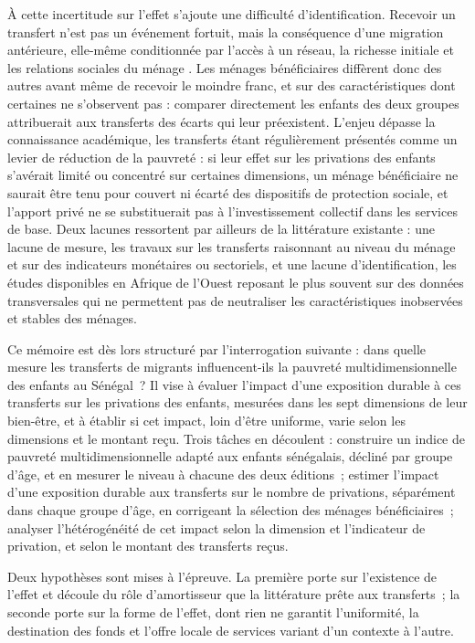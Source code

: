 À cette incertitude sur l'effet s'ajoute une difficulté d'identification.
Recevoir un transfert n'est pas un événement fortuit, mais la conséquence
d'une migration antérieure, elle-même conditionnée par l'accès à un réseau,
la richesse initiale et les relations sociales du ménage
\parencite{massey1993}. Les ménages bénéficiaires diffèrent donc des
autres avant même de recevoir le moindre franc, et sur des
caractéristiques dont certaines ne s'observent pas : comparer directement
les enfants des deux groupes attribuerait aux transferts des écarts qui
leur préexistent. L'enjeu dépasse la connaissance académique, les
transferts étant régulièrement présentés comme un levier de réduction de
la pauvreté : si leur effet sur les privations des enfants s'avérait
limité ou concentré sur certaines dimensions, un ménage bénéficiaire ne
saurait être tenu pour couvert ni écarté des dispositifs de protection
sociale, et l'apport privé ne se substituerait pas à l'investissement
collectif dans les services de base. Deux lacunes ressortent par ailleurs
de la littérature existante : une lacune de mesure, les travaux sur les
transferts raisonnant au niveau du ménage et sur des indicateurs
monétaires ou sectoriels, et une lacune d'identification, les études
disponibles en Afrique de l'Ouest reposant le plus souvent sur des données
transversales qui ne permettent pas de neutraliser les caractéristiques
inobservées et stables des ménages.

Ce mémoire est dès lors structuré par l'interrogation suivante : dans
quelle mesure les transferts de migrants influencent-ils la pauvreté
multidimensionnelle des enfants au Sénégal~? Il vise à évaluer l'impact
d'une exposition durable à ces transferts sur les privations des enfants,
mesurées dans les sept dimensions de leur bien-être, et à établir si cet
impact, loin d'être uniforme, varie selon les dimensions et le montant
reçu. Trois tâches en découlent : construire un indice de pauvreté
multidimensionnelle adapté aux enfants sénégalais, décliné par groupe
d'âge, et en mesurer le niveau à chacune des deux éditions~; estimer
l'impact d'une exposition durable aux transferts sur le nombre de
privations, séparément dans chaque groupe d'âge, en corrigeant la
sélection des ménages bénéficiaires~; analyser l'hétérogénéité de cet
impact selon la dimension et l'indicateur de privation, et selon le
montant des transferts reçus.

Deux hypothèses sont mises à l'épreuve. La première porte sur l'existence
de l'effet et découle du rôle d'amortisseur que la littérature prête aux
transferts~; la seconde porte sur la forme de l'effet, dont rien ne
garantit l'uniformité, la destination des fonds et l'offre locale de
services variant d'un contexte à l'autre.

